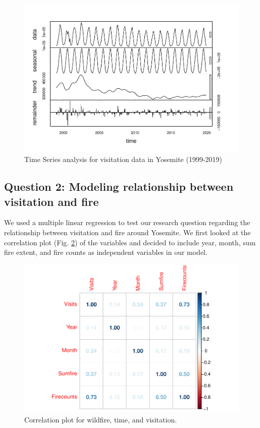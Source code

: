 \documentclass[
  12pt,
]{article}
\begin{document}
\begin{figure}
\centering
\includegraphics{CodeFinal_files/figure-latex/TSplotvisit-1.pdf}
\caption{\label{fig:TSplotvisit}Time Series analysis for visitation data in Yosemite (1999-2019)}
\end{figure}

\hypertarget{question-2-modeling-relationship-between-visitation-and-fire}{%
\subsection{Question 2: Modeling relationship between visitation and fire}\label{question-2-modeling-relationship-between-visitation-and-fire}}

We used a multiple linear regression to test our research question regarding the relationship between visitation and fire around Yosemite. We first looked at the correlation plot (Fig. \ref{fig:corrplot}) of the variables and decided to include year, month, sum fire extent, and fire counts as independent variables in our model.

\begin{figure}
\centering
\includegraphics{CodeFinal_files/figure-latex/corrplot-1.pdf}
\caption{\label{fig:corrplot}Correlation plot for wildfire, time, and visitation.}
\end{figure}
\end{document}
